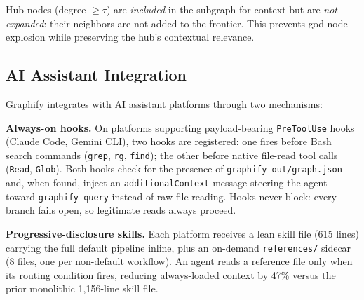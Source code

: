 Hub nodes (degree $\geq \tau$) are \emph{included} in the subgraph for context
but are \emph{not expanded}: their neighbors are not added to the frontier. This
prevents god-node explosion while preserving the hub's contextual relevance.

\subsection{AI Assistant Integration}

Graphify integrates with AI assistant platforms through two mechanisms:

\textbf{Always-on hooks.} On platforms supporting payload-bearing \texttt{PreToolUse}
hooks (Claude Code, Gemini CLI), two hooks are registered: one fires before
Bash search commands (\texttt{grep}, \texttt{rg}, \texttt{find}); the other
before native file-read tool calls (\texttt{Read}, \texttt{Glob}). Both hooks
check for the presence of \texttt{graphify-out/graph.json} and, when found,
inject an \texttt{additionalContext} message steering the agent toward
\texttt{graphify query} instead of raw file reading. Hooks never block: every
branch fails open, so legitimate reads always proceed.

\textbf{Progressive-disclosure skills.} Each platform receives a lean skill file
(615 lines) carrying the full default pipeline inline, plus an on-demand
\texttt{references/} sidecar (8 files, one per non-default workflow). An agent
reads a reference file only when its routing condition fires, reducing always-loaded
context by 47\% versus the prior monolithic 1,156-line skill file.

